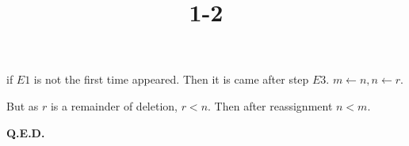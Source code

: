 \documentclass{article}
\title{1-2}
\begin{document}
\maketitle

if \( E1 \) is not the first time appeared. Then it is came after step \( E3 \). \( m \leftarrow n, n \leftarrow r \).

But as \( r \) is a remainder of deletion, \( r < n \). Then after reassignment \( n < m \).

\textbf{Q.E.D.}
\end{document}
